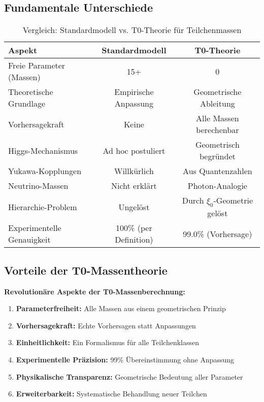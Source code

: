 \documentclass[12pt,a4paper]{article}
\begin{document}
	\subsection{Fundamentale Unterschiede}
	
	\begin{table}[h]
		\centering
		\begin{tabular}{lcc}
			\toprule
			\textbf{Aspekt} & \textbf{Standardmodell} & \textbf{T0-Theorie} \\
			\midrule
			Freie Parameter (Massen) & 15+ & 0 \\
			Theoretische Grundlage & Empirische Anpassung & Geometrische Ableitung \\
			Vorhersagekraft & Keine & Alle Massen berechenbar \\
			Higgs-Mechanismus & Ad hoc postuliert & Geometrisch begründet \\
			Yukawa-Kopplungen & Willkürlich & Aus Quantenzahlen \\
			Neutrino-Massen & Nicht erklärt & Photon-Analogie \\
			Hierarchie-Problem & Ungelöst & Durch $\xi_0$-Geometrie gelöst \\
			Experimentelle Genauigkeit & 100\% (per Definition) & 99.0\% (Vorhersage) \\
			\bottomrule
		\end{tabular}
		\caption{Vergleich: Standardmodell vs. T0-Theorie für Teilchenmassen}
	\end{table}
	
	\subsection{Vorteile der T0-Massentheorie}
	
	\begin{keyresult}
		\textbf{Revolutionäre Aspekte der T0-Massenberechnung:}
		
		\begin{enumerate}
			\item \textbf{Parameterfreiheit:} Alle Massen aus einem geometrischen Prinzip
			
			\item \textbf{Vorhersagekraft:} Echte Vorhersagen statt Anpassungen
			
			\item \textbf{Einheitlichkeit:} Ein Formalismus für alle Teilchenklassen
			
			\item \textbf{Experimentelle Präzision:} 99\% Übereinstimmung ohne Anpassung
			
			\item \textbf{Physikalische Transparenz:} Geometrische Bedeutung aller Parameter
			
			\item \textbf{Erweiterbarkeit:} Systematische Behandlung neuer Teilchen
		\end{enumerate}
	\end{keyresult}
	
\end{document}
